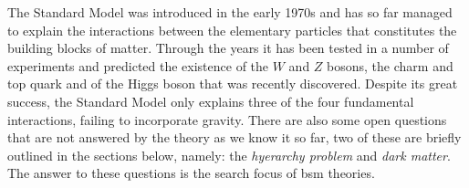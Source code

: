 The Standard Model was introduced in the early 1970s and has so far managed to
explain the interactions between the elementary particles that constitutes the
building blocks of matter. Through the years it has been tested in a number of
experiments and predicted the existence of the $W$ and $Z$ bosons, the charm and
top quark and of the Higgs boson that was recently discovered. Despite its great
success, the Standard Model only explains three of the four fundamental
interactions, failing to incorporate gravity. There are also some open questions
that are not answered by the theory as we know it so far, two of these are
briefly outlined in the sections below, namely: the \emph{hyerarchy problem} and
\emph{dark matter}. The answer to these questions is the search focus of
\gls{bsm} theories.
